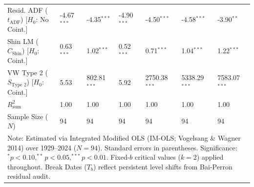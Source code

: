 \begin{table}[H]
\begin{tabular}{p{3.8cm}p{1.35cm}p{1.35cm}p{1.35cm}p{1.35cm}p{1.35cm}p{1.35cm}}
\makecell[l]{Resid. ADF ($t_{\text{ADF}}$) \\ {\scriptsize [$H_0$: No Coint.]}} & -4.67$^{***}$ & -4.35$^{***}$ & -4.90$^{***}$ & -4.50$^{***}$ & -4.58$^{***}$ & -3.90$^{**}$  \\
\makecell[l]{Shin LM ($C_{\text{Shin}}$) \\ {\scriptsize [$H_0$: Coint.]}} & 0.63$^{***}$ & 1.02$^{***}$ & 0.52$^{***}$ & 0.71$^{***}$ & 1.04$^{***}$ & 1.22$^{***}$  \\
\makecell[l]{VW Type 2 ($S_{\text{Type 2}}$) \\ {\scriptsize [$H_0$: Coint.]}} & 5.53 & 802.81$^{***}$ & 5.92 & 2750.38$^{***}$ & 5338.29$^{***}$ & 7583.07$^{***}$  \\
\midrule
$R^2_{\text{sum}}$ & 1.00 & 1.00 & 1.00 & 1.00 & 1.00 & 1.00  \\
Sample Size ($N$) & 94 & 94 & 94 & 94 & 94 & 94  \\
\bottomrule
\multicolumn{7}{p{13.2cm}}{\footnotesize Note: Estimated via Integrated Modified OLS (IM-OLS; Vogelsang \& Wagner 2014) over 1929--2024 ($N=94$). Standard errors in parentheses. Significance: $^*p<0.10, ^{**}p<0.05, ^{***}p<0.01$. Fixed-$b$ critical values ($k=2$) applied throughout. Break Dates ($T_b$) reflect persistent level shifts from Bai-Perron residual audit.}
\end{tabular}
\end{table}
